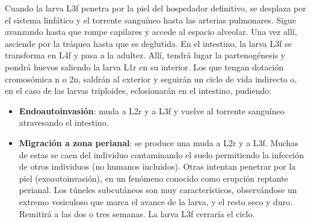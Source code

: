 Cuando la larva L3f penetra por la piel del hospedador definitivo, se desplaza por el sistema linfático y el torrente sanguíneo hasta las arterias pulmonares. Sigue avanzando hasta que rompe capilares y accede al espacio alveolar. Una vez allí, asciende por la tráquea hasta que es deglutida. En el intestino, la larva L3f se transforma en L4f y pasa a la adultez. Allí, tendrá lugar la partenogénesis y pondrá huevos saliendo la larva L1r en su interior. Los que tengan dotación cromosómica n o 2n, saldrán al exterior y seguirán un ciclo de vida indirecto o, en el caso de las larvas triploides, eclosionarán en el intestino, pudiendo:
\begin{itemize}[itemsep=0pt,parsep=0pt,topsep=0pt,partopsep=0pt]
	\item \textbf{Endoautoinvasión}: muda a L2r y a L3f y vuelve al torrente sanguíneo atravesando el intestino.
	\item \textbf{Migración a zona perianal}: se produce una muda a L2r y a L3f. Muchas de estas se caen del individuo contaminando el suelo permitiendo la infección de otros individuos (no humanos incluidos). Otras intentan penetrar por la piel (exoautoinvasión), en un fenómeno conocido como erupción reptante perianal. Los túneles subcutáneos son muy característicos, observándose un extremo vesiculoso que marca el avance de la larva, y el resto seco y duro. Remitirá a las dos o tres semanas. La larva L3f cerraría el ciclo.
\end{itemize}
